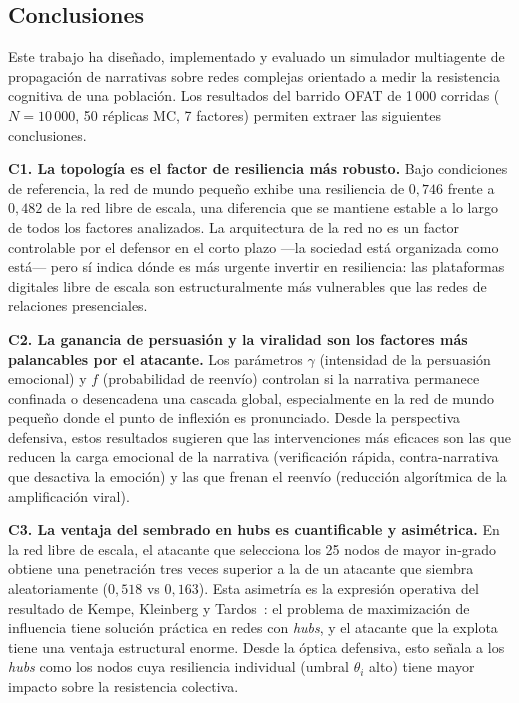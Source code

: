 \documentclass[12pt]{extarticle}
\numberwithin{equation}{section}
\begin{document}
\begin{refsection}
\subsection{Conclusiones}

Este trabajo ha diseñado, implementado y evaluado un simulador multiagente de propagación de narrativas sobre redes complejas orientado a medir la resistencia cognitiva de una población. Los resultados del barrido OFAT de 1\,000 corridas ($N=10\,000$, 50 réplicas MC, 7 factores) permiten extraer las siguientes conclusiones.

\textbf{C1. La topología es el factor de resiliencia más robusto.} Bajo condiciones de referencia, la red de mundo pequeño exhibe una resiliencia de $0{,}746$ frente a $0{,}482$ de la red libre de escala, una diferencia que se mantiene estable a lo largo de todos los factores analizados. La arquitectura de la red no es un factor controlable por el defensor en el corto plazo ---la sociedad está organizada como está--- pero sí indica dónde es más urgente invertir en resiliencia: las plataformas digitales libre de escala son estructuralmente más vulnerables que las redes de relaciones presenciales.

\textbf{C2. La ganancia de persuasión y la viralidad son los factores más palancables por el atacante.} Los parámetros $\gamma$ (intensidad de la persuasión emocional) y $f$ (probabilidad de reenvío) controlan si la narrativa permanece confinada o desencadena una cascada global, especialmente en la red de mundo pequeño donde el punto de inflexión es pronunciado. Desde la perspectiva defensiva, estos resultados sugieren que las intervenciones más eficaces son las que reducen la carga emocional de la narrativa (verificación rápida, contra-narrativa que desactiva la emoción) y las que frenan el reenvío (reducción algorítmica de la amplificación viral).

\textbf{C3. La ventaja del sembrado en hubs es cuantificable y asimétrica.} En la red libre de escala, el atacante que selecciona los 25 nodos de mayor in-grado obtiene una penetración tres veces superior a la de un atacante que siembra aleatoriamente ($0{,}518$ vs $0{,}163$). Esta asimetría es la expresión operativa del resultado de Kempe, Kleinberg y Tardos~\cite{KempeKleinbergTardos2003}: el problema de maximización de influencia tiene solución práctica en redes con \emph{hubs}, y el atacante que la explota tiene una ventaja estructural enorme. Desde la óptica defensiva, esto señala a los \emph{hubs} como los nodos cuya resiliencia individual (umbral $\theta_i$ alto) tiene mayor impacto sobre la resistencia colectiva.


\end{refsection}
\end{document}
